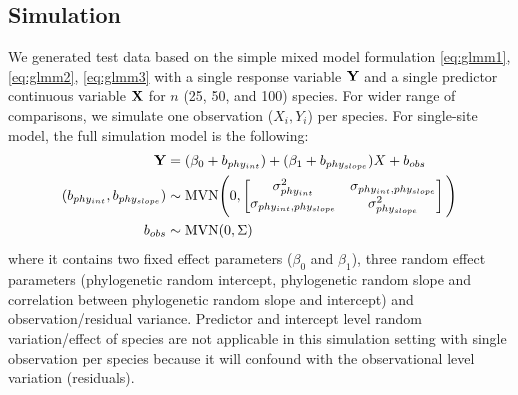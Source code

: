 \subsection{Simulation}

We generated test data based on the simple mixed model formulation \ref{eq:glmm1}, \ref{eq:glmm2}, \ref{eq:glmm3} with a single response variable ${\mathbf Y}$ and a single predictor continuous variable ${\mathbf X}$ for $n$ (25, 50, and 100) species.
For wider range of comparisons, we simulate one observation ($X_i,Y_i$) per species.
For single-site model, the full simulation model is the following:
\begin{align}
{\mathbf Y} & = (\beta_0 + b_{phy_{int}}) + (\beta_1 + b_{phy_{slope}}) X + b_{obs}\\
(b_{phy_{int}}, b_{phy_{slope}}) & \sim \textrm{MVN} \Bigg( 0, \begin{bmatrix}
\sigma^2_{phy_{int}} & \sigma_{phy_{int},phy_{slope}} \\ 
\sigma_{phy_{int},phy_{slope}} & \sigma^2_{phy_{slope}}
\end{bmatrix}
\Bigg) \\
b_{obs} & \sim \textrm{MVN} ( 0 , \Sigma)
\end{align}
where it contains two fixed effect parameters ($\beta_0$ and $\beta_1$), three random effect parameters (phylogenetic random intercept, phylogenetic random slope and correlation between phylogenetic random slope and intercept) and observation/residual variance.  
Predictor and intercept level random variation/effect of species are not applicable in this simulation setting with single observation per species because it will confound with the observational level variation (residuals).

